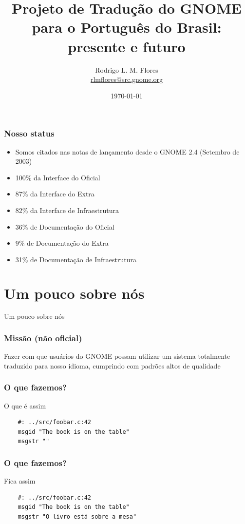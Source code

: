 \documentclass{beamer}
\title{Projeto de Tradução do GNOME para o Português do Brasil: presente e futuro}
\author{Rodrigo L. M. Flores \\ \url{rlmflores@src.gnome.org}}
\institute{GNOME Brasil}
\begin{document}
\date{\today}

\frame{\titlepage}

\frame{\tableofcontents}

\begin{frame}
    \frametitle{Nosso status}    
    \begin{itemize}[<+->]
        \item \color[rgb]{0,1,0} Somos citados nas notas de lançamento desde o GNOME 2.4 (Setembro de 2003)  
        \item \color[rgb]{0,1,0} 100\% da Interface do Oficial 
        \item \color[rgb]{0,1,0} 87\% da Interface do Extra
        \item \color[rgb]{0,1,0} 82\% da Interface de Infraestrutura
        \item \color[rgb]{1,0,0} 36\% de Documentação do Oficial
        \item \color[rgb]{1,0,0} 9\%  de Documentação do Extra
        \item \color[rgb]{1,0,0} 31\% de Documentação de Infraestrutura
    \end{itemize}
\end{frame}


\section{Um pouco sobre nós}

\begin{frame}
  \centering
  \Huge{Um pouco sobre nós}
\end{frame}

\begin{frame}
    \frametitle{Missão (não oficial)}
    Fazer com que usuários do GNOME possam utilizar um sistema 
    totalmente traduzido para nosso idioma, cumprindo 
    com padrões altos de qualidade 
\end{frame}

\begin{frame}[fragile]
  \frametitle{O que fazemos?}
  \begin{block}{O que é assim}
    \begin{verbatim}
    #: ../src/foobar.c:42
    msgid "The book is on the table"
    msgstr ""  
    \end{verbatim}
  \end{block}
\end{frame}

\begin{frame}[fragile]
  \frametitle{O que fazemos?}
  \begin{block}{Fica assim}
    \begin{verbatim}
    #: ../src/foobar.c:42
    msgid "The book is on the table"
    msgstr "O livro está sobre a mesa"  
    \end{verbatim}
  \end{block}
\end{frame}
\end{document}

